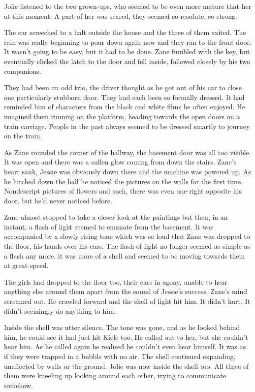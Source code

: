 Jolie listened to the two grown-ups, who seemed to be even more mature that her at this moment.  A part of her was scared, they seemed so resolute, so strong.



\thoughtbreak



The car screeched to a halt outside the house and the three of them exited.  The rain was really beginning to pour down again now and they ran to the front door.  It wasn't going to be easy, but it had to be done.  Zane fumbled with the key, but eventually clicked the latch to the door and fell inside, followed closely by his two companions.

They had been an odd trio, the driver thought as he got out of his car to close one particularly stubborn door.  They had each been so formally dressed.  It had reminded him of characters from the black and white films he often enjoyed.  He imagined them running on the platform, heading towards the open doors on a train carriage.  People in the past always seemed to be dressed smartly to journey on the train.

As Zane rounded the corner of the hallway, the basement door was all too visible.  It was open and there was a sullen glow coming from down the stairs.  Zane's heart sank, Jessie was obviously down there and the machine was powered up.  As he lurched down the hall he noticed the pictures on the walls for the first time.  Nondescript pictures of flowers and such, there was even one right opposite his door, but he'd never noticed before. 

Zane almost stopped to take a closer look at the paintings but then, in an instant, a flash of light seemed to emanate from the basement.  It was accompanied by a slowly rising tone which was so loud that Zane was dropped to the floor, his hands over his ears.  The flash of light no longer seemed as simple as a flash any more, it was more of a shell and seemed to be moving towards them at great speed.  

The girls had dropped to the floor too, their ears in agony, unable to hear anything else around them apart from the sound of Jessie's success.  Zane's mind screamed out.  He crawled forward and the shell of light hit him.  It didn't hurt.  It didn't seemingly do anything to him.  

Inside the shell was utter silence.  The tone was gone, and as he looked behind him, he could see it had just hit Kiele too.  He called out to her, but she couldn't hear him.  As he called again he realised he couldn't even hear himself.  It was as if they were trapped in a bubble with no air.  The shell continued expanding, unaffected by walls or the ground.  Jolie was now inside the shell too.  All three of them were kneeling up looking around each other, trying to communicate somehow.

